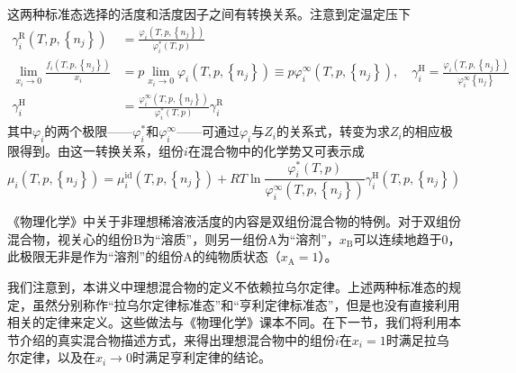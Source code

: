 \documentclass[main.tex]{subfiles}
\begin{document}
这两种标准态选择的活度和活度因子之间有转换关系。注意到定温定压下
\begin{align*}
    \gamma_i^\text{R}\left(T,p,\left\{n_j\right\}\right)              & =\frac{\varphi_i\left(T,p,\left\{n_j\right\}\right)}{\varphi_i^*\left(T,p\right)}                                                                                                                                                       \\
    \lim_{x_i\to 0}\frac{f_i\left(T,p,\left\{n_j\right\}\right)}{x_i} & =p\lim_{x_i\to 0}\varphi_i\left(T,p,\left\{n_j\right\}\right)\equiv p\varphi_i^\infty\left(T,p,\left\{n_j\right\}\right),\quad\gamma_i^\text{H}=\frac{\varphi_i\left(T,p,\left\{n_j\right\}\right)}{\varphi_i^\infty\left\{n_j\right\}} \\
    \gamma_i^\text{H}                                                 & =\frac{\varphi_i^\infty\left(T,p,\left\{n_j\right\}\right)}{\varphi_i^*\left(T,p\right)}\gamma_i^\text{R}
\end{align*}
其中$\varphi_i$的两个极限——$\varphi_i^*$和$\varphi_i^\infty$——可通过$\varphi_i$与$Z_i$的关系式，转变为求$Z_i$的相应极限得到。由这一转换关系，组份$i$在混合物中的化学势又可表示成
\begin{equation}\label{eq:II.4_Henry_standardstate_activity_factor}
    \mu_i\left(T,p,\left\{n_j\right\}\right)=\mu_i^\text{id}\left(T,p,\left\{n_j\right\}\right)+RT\ln\frac{\varphi_i^*\left(T,p\right)}{\varphi_i^\infty\left(T,p,\left\{n_j\right\}\right)}\gamma_i^\text{H}\left(T,p,\left\{n_j\right\}\right)
\end{equation}

《物理化学》中关于非理想稀溶液活度的内容是双组份混合物的特例。对于双组份混合物，视关心的组份B为“溶质”，则另一组份A为“溶剂”，$x_\text{B}$可以连续地趋于0，此极限无非是作为“溶剂”的组份A的纯物质状态（$x_\text{A}=1$）。

我们注意到，本讲义中理想混合物的定义不依赖拉乌尔定律。上述两种标准态的规定，虽然分别称作“拉乌尔定律标准态”和“亨利定律标准态”，但是也没有直接利用相关的定律来定义。这些做法与《物理化学》课本不同。在下一节，我们将利用本节介绍的真实混合物描述方式，来得出理想混合物中的组份$i$在$x_i=1$时满足拉乌尔定律，以及在$x_i\rightarrow 0$时满足亨利定律的结论。
\end{document}

